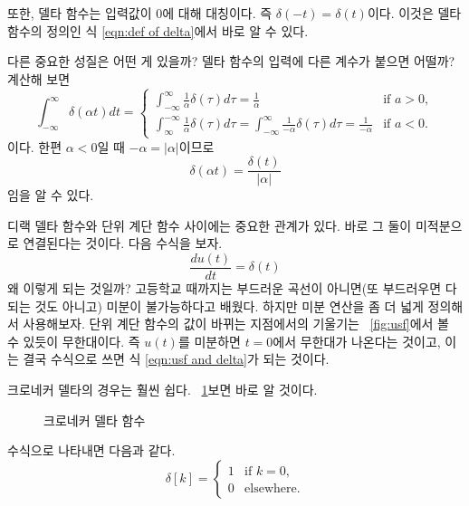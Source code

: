 또한, 델타 함수는 입력값이 0에 대해 대칭이다. 즉 $\delta(-t)=\delta(t)$이다. 이것은 델타 함수의 정의인 식 \ref{eqn:def of delta}에서 바로 알 수 있다.
\par
다른 중요한 성질은 어떤 게 있을까? 델타 함수의 입력에 다른 계수가 붙으면 어떨까? 계산해 보면
\begin{equation*}
    \int_{-\infty}^{\infty}\delta(\alpha t)dt=\begin{cases}
        \int_{-\infty}^{\infty} \frac{1}{\alpha }\delta(\tau )d\tau=\frac{1}{\alpha } & \text{if } a>0,\\
        \int_{\infty}^{-\infty} \frac{1}{\alpha }\delta(\tau )d\tau= \int_{-\infty}^{\infty} \frac{1}{-\alpha }\delta(\tau )d\tau = \frac{1}{-\alpha } & \text{if } a<0.
    \end{cases}
\end{equation*}
이다. 한편 $\alpha <0$일 때 $-\alpha=\left\vert \alpha \right\vert$이므로
\begin{equation}
    \delta(\alpha t)=\frac{\delta(t)}{\left\vert \alpha \right\vert}
\end{equation}
임을 알 수 있다.
\par
디랙 델타 함수와 단위 계단 함수 사이에는 중요한 관계가 있다. 바로 그 둘이 미적분으로 연결된다는 것이다. 다음 수식을 보자.
\begin{equation}
    \frac{du(t)}{dt} =\delta(t) \label{eqn:usf and delta}
\end{equation}
왜 이렇게 되는 것일까? 고등학교 때까지는 부드러운 곡선이 아니면(또 부드러우면 다 되는 것도 아니고) 미분이 불가능하다고 배웠다. 하지만 미분 연산을 좀 더 넓게 정의해서 사용해보자.
단위 계단 함수의 값이 바뀌는 지점에서의 기울기는 \figurename~\ref{fig:usf}에서 볼 수 있듯이 무한대이다. 즉 $u(t)$를 미분하면 $t=0$에서 무한대가 나온다는 것이고, 이는 결국 수식으로 쓰면 
식 \ref{eqn:usf and delta}가 되는 것이다.
\par
크로네커 델타의 경우는 훨씬 쉽다. \figurename~\ref{fig:kronecher}\을 보면 바로 알 것이다.
\begin{figure}[!hbp]
    \centering
    \caption{크로네커 델타 함수}\label{fig:kronecher}
\end{figure}
수식으로 나타내면 다음과 같다.
\begin{equation}
    \delta[k]=\begin{cases}
        1 & \text{if } k = 0,\\
        0 & \text{elsewhere.}
    \end{cases}
\end{equation}

